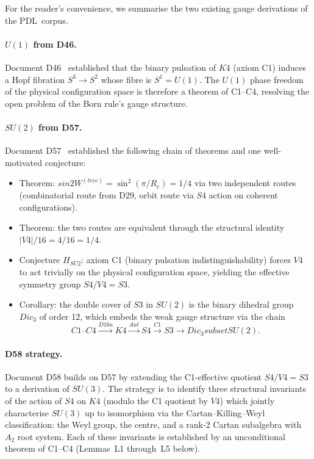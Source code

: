 \documentclass[11pt,a4paper]{article}
\def\Sfour{S4}%
\def\Vfour{V4}%
\def\Sthree{S3}%
\def\SUthree{SU(3)}%
\def\SUtwo{SU(2)}%
\def\Uone{U(1)}%
\def\Kfour{K4}%
\def\Re{Re}%
\def\PDL{PDL}%
\def\cong{=}%
\def\subset{ subset }%
\def\Aut{Aut}%
\def\Dic{Dic}%
\def\sinW{sin2W}%
\def\thetaW{thetaW}%
\def\mathrm#1{#1}%
\def\textsc#1{#1}%
\theoremstyle{plain}
\theoremstyle{definition}
\theoremstyle{remark}
\newcommand{\PDL}{\textsc{PDL}}
\newcommand{\Kfour}{K_4}
\newcommand{\Sfour}{S_4}
\newcommand{\Vfour}{V_4}
\newcommand{\Sthree}{S_3}
\newcommand{\SUthree}{\mathrm{SU}(3)}
\newcommand{\SUtwo}{\mathrm{SU}(2)}
\newcommand{\Uone}{\mathrm{U}(1)}
\newcommand{\Aut}{\mathrm{Aut}}
\newcommand{\Dic}{\mathrm{Dic}}
\renewcommand{\Re}{R_e}
\newcommand{\thetaW}{\theta_W}
\newcommand{\sinW}{\sin^2\!\thetaW}
\begin{document}
For the reader's convenience, we summarise the two existing gauge derivations of the \PDL\ corpus.

\paragraph{$\Uone$ from D46.} Document D46~\cite{PDL_D46} established that the binary pulsation of $\Kfour$ (axiom C1) induces a Hopf fibration $S^3 \to S^2$ whose fibre is $S^1 = \Uone$. The $\Uone$ phase freedom of the physical configuration space is therefore a theorem of C1--C4, resolving the open problem of the Born rule's gauge structure.

\paragraph{$\SUtwo$ from D57.} Document D57~\cite{PDL_D57} established the following chain of theorems and one well-motivated conjecture:
\begin{itemize}[leftmargin=2em]
\item Theorem: $\sinW^{(\mathrm{tree})} = \sin^2(\pi/\Re) = 1/4$ via two independent routes (combinatorial route from D29, orbit route via $\Sfour$ action on coherent configurations).
\item Theorem: the two routes are equivalent through the structural identity $|\Vfour|/16 = 4/16 = 1/4$.
\item Conjecture $H_{\mathrm{SU2}}$: axiom C1 (binary pulsation indistinguishability) forces $\Vfour$ to act trivially on the physical configuration space, yielding the effective symmetry group $\Sfour/\Vfour \cong \Sthree$.
\item Corollary: the double cover of $\Sthree$ in $\SUtwo$ is the binary dihedral group $\Dic_3$ of order 12, which embeds the weak gauge structure via the chain
\begin{equation}
\mathrm{C1\text{--}C4} \xrightarrow{D16a} \Kfour \xrightarrow{\Aut} \Sfour \xrightarrow{C1} \Sthree \to \Dic_3 \subset \SUtwo.
\label{eq:D57_chain}
\end{equation}
\end{itemize}

\paragraph{D58 strategy.} Document D58 builds on D57 by extending the C1-effective quotient $\Sfour/\Vfour \cong \Sthree$ to a derivation of $\SUthree$. The strategy is to identify three structural invariants of the action of $\Sfour$ on $\Kfour$ (modulo the C1 quotient by $\Vfour$) which jointly characterise $\SUthree$ up to isomorphism via the Cartan--Killing--Weyl classification: the Weyl group, the centre, and a rank-2 Cartan subalgebra with $A_2$ root system. Each of these invariants is established by an unconditional theorem of C1--C4 (Lemmas~L1 through~L5 below).
\end{document}
